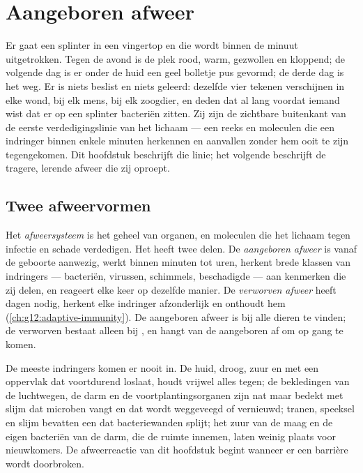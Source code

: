 \chapter{Aangeboren afweer}\label{ch:g12:innate-immunity}

Er gaat een splinter in een vingertop en die wordt binnen de minuut
uitgetrokken. Tegen de avond is de plek rood, warm, gezwollen en
kloppend; de volgende dag is er onder de huid een geel bolletje pus
gevormd; de derde dag is het weg. Er is niets beslist en niets geleerd:
dezelfde vier tekenen verschijnen in elke wond, bij elk mens, bij elk
zoogdier, en deden dat al lang voordat iemand wist dat er op een splinter
bacteriën zitten. Zij zijn de zichtbare buitenkant van de eerste
verdedigingslinie van het lichaam --- een reeks  en moleculen die
een indringer binnen enkele minuten herkennen en aanvallen zonder hem ooit
te zijn tegengekomen. Dit hoofdstuk beschrijft die linie; het volgende
beschrijft de tragere, lerende afweer die zij oproept.

\section{Twee afweervormen}

\begin{definition}\label{def:g12:innate-immunity:immunity}
Het \emph{afweersysteem} is het geheel van organen,
 en moleculen die het lichaam tegen infectie en schade
verdedigen. Het heeft twee delen. De \emph{aangeboren
afweer} is vanaf de geboorte aanwezig, werkt
binnen minuten tot uren, herkent brede klassen van indringers ---
bacteriën, virussen, schimmels, beschadigde  --- aan kenmerken die
zij delen, en reageert elke keer op dezelfde manier. De \emph{verworven
afweer} heeft dagen nodig, herkent elke indringer
afzonderlijk en onthoudt hem (\cref{ch:g12:adaptive-immunity}). De
aangeboren afweer is bij alle dieren te vinden; de verworven bestaat
alleen bij , en hangt van de aangeboren af om op gang te komen.
\end{definition}

\begin{proposition}\label{prop:g12:innate-immunity:barriers}
De meeste indringers komen er nooit in. De huid, droog, zuur en met een
oppervlak dat voortdurend loslaat, houdt vrijwel alles tegen; de
bekledingen van de luchtwegen, de darm en de voortplantingsorganen zijn
nat maar bedekt met slijm dat microben vangt en dat wordt weggeveegd of
vernieuwd; tranen, speeksel en slijm bevatten een  dat
bacteriewanden splijt; het zuur van de maag en de eigen bacteriën van de
darm, die de ruimte innemen, laten weinig plaats voor nieuwkomers. De
afweerreactie van dit hoofdstuk begint wanneer er een barrière wordt
doorbroken.
\end{proposition}
\admitted

